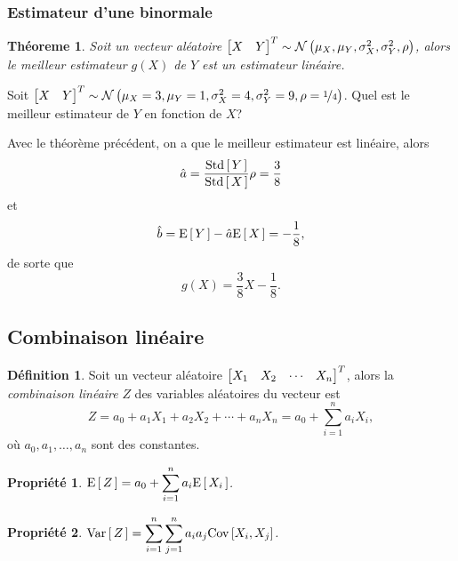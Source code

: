 \documentclass[11pt]{article}
\makeatletter
\newcommand\BiNorm[5]{%
	\ensuremath{%
		\mathcal{N}\left(#1,#2,#3,#4,#5\right)%
	}%
}%
\newcommand\Esp[1]{%
	\ensuremath{%
		\mathrm{E}\left[\,#1\,\right]%
	}%
}%
\newcommand\Var[1]{%
	\ensuremath{%
		\mathrm{Var}\left[\,#1\,\right]%
	}%
}%
\newcommand\Std[1]{%
	\ensuremath{%
		\mathrm{Std}\left[\,#1\,\right]%
	}%
}%
\newcommand\Cov[2]{%
	\ensuremath{%
		\mathrm{Cov}\left[#1,#2\right]%
	}%
}%
\newcommand\invec[1]{%
	\ensuremath{%
		\left[%
			\begin{matrix}%
				#1%
			\end{matrix}%
		\right]^T%
	}%
}%
\newtheorem{theoreme}{Théoreme}[section]
\newtheorem{property}{Propriété}
\theoremstyle{remark}
\theoremstyle{definition}
\newtheorem*{@definition}{Définition}
\newenvironment{definition}{%
	\begin{@definition}%
}{%
	\end{@definition}%
	\setcounter{property}{0}%
}
\makeatother
\begin{document}
\subsubsection{Estimateur d'une binormale}
\begin{theoreme}
	Soit un vecteur aléatoire $\invec{X&Y}\sim\BiNorm{\mu_X}{\mu_Y}{\sigma_X^2}
	{\sigma_Y^2}{\rho}$, alors le meilleur estimateur $g(X)$ de $Y$ est un
	estimateur linéaire.
\end{theoreme}

\begin{exemple}
	Soit $\invec{X&Y}\sim\BiNorm{\mu_X=3}{\mu_Y=1}{\sigma_X^2=4}{\sigma_Y^2=9}
	{\rho=\nicefrac{1}{4}}$. Quel est le meilleur estimateur de $Y$ en fonction
	de $X$?

	Avec le théorème précédent, on a que le meilleur estimateur est linéaire,
	alors
	\begin{equation*}
		\hat{a}=\frac{\Std{Y}}{\Std{X}}\rho=\frac{3}{8}
	\end{equation*}
	et
	\begin{equation*}
		\hat{b}=\Esp{Y}-\hat{a}\Esp{X}=-\frac{1}{8},
	\end{equation*}
	de sorte que
	\begin{equation*}
		g(X)=\frac{3}{8}X-\frac{1}{8}.
	\end{equation*}
\end{exemple}

\subsection{Combinaison linéaire}
\begin{definition}
	Soit un vecteur aléatoire $\invec{X_1&X_2&\cdots&X_n}$, alors la
	\textit{combinaison linéaire} $Z$ des variables aléatoires du vecteur est
	\begin{equation*}
		Z=a_0+a_1X_1+a_2X_2+\cdots+a_nX_n=a_0+\sum_{i=1}^na_iX_i,
	\end{equation*}
	où $a_0,a_1,\dots,a_n$ sont des constantes.
\end{definition}

\begin{property}
	$\Esp{Z}=a_0+\displaystyle\sum_{i=1}^na_i\Esp{X_i}$.
\end{property}

\begin{property}
	$\Var{Z}=\displaystyle\sum_{i=1}^n\displaystyle\sum_{j=1}^na_ia_j
	\Cov{X_i}{X_j}$.
\end{property}
\end{document}
